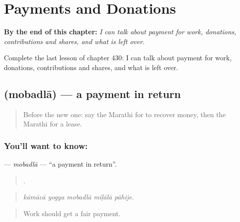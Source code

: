 
\chapter{Payments and Donations}
\label{ch:mr-payments-and-donations}

\begin{chapteropening}
\textbf{By the end of this chapter:} \emph{I can talk about payment for work, donations, contributions and shares, and what is left over.}

Complete the last lesson of chapter 430: I can talk about payment for work, donations, contributions and shares, and what is left over.
\end{chapteropening}

\section[\texorpdfstring{\mr{मोबदला} (mobadlā)}{मोबदला (mobadlā)}]{ (mobadlā) — a payment in return}

\label{lesson:MR-C430-mobadla}



\begin{quote}
Before the new one: say the Marathi for to recover money, then the Marathi for a lease.
\end{quote}

\subsection*{You'll want to know: }
\textbf{} — \emph{mobadlā} — \textquotedblleft{}a payment in return\textquotedblright{}.

\begin{quote}
    .
\end{quote}

\begin{quote}
\emph{kāmācā yogya mobadlā miḷālā pāhije.}
\end{quote}

\begin{quote}
Work should get a fair payment.
\end{quote}

